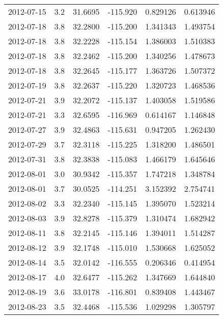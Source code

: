 \begin{tabular}{lrrrrr}
2012-07-15 &       3.2 &  31.6695 &  -115.920 &         0.829126 &         0.613946 \\
2012-07-18 &       3.8 &  32.2800 &  -115.200 &         1.341343 &         1.493754 \\
2012-07-18 &       3.8 &  32.2228 &  -115.154 &         1.386003 &         1.510383 \\
2012-07-18 &       3.8 &  32.2462 &  -115.200 &         1.340256 &         1.478673 \\
2012-07-18 &       3.8 &  32.2645 &  -115.177 &         1.363726 &         1.507372 \\
2012-07-19 &       3.8 &  32.2637 &  -115.220 &         1.320723 &         1.468536 \\
2012-07-21 &       3.9 &  32.2072 &  -115.137 &         1.403058 &         1.519586 \\
2012-07-21 &       3.3 &  32.6595 &  -116.969 &         0.614167 &         1.146848 \\
2012-07-27 &       3.9 &  32.4863 &  -115.631 &         0.947205 &         1.262430 \\
2012-07-29 &       3.7 &  32.3118 &  -115.225 &         1.318200 &         1.486501 \\
2012-07-31 &       3.8 &  32.3838 &  -115.083 &         1.466179 &         1.645646 \\
2012-08-01 &       3.0 &  30.9342 &  -115.357 &         1.747218 &         1.348784 \\
2012-08-01 &       3.7 &  30.0525 &  -114.251 &         3.152392 &         2.754741 \\
2012-08-02 &       3.3 &  32.2340 &  -115.145 &         1.395070 &         1.523214 \\
2012-08-03 &       3.9 &  32.8278 &  -115.379 &         1.310474 &         1.682942 \\
2012-08-11 &       3.8 &  32.2145 &  -115.146 &         1.394011 &         1.514287 \\
2012-08-12 &       3.9 &  32.1748 &  -115.010 &         1.530668 &         1.625052 \\
2012-08-14 &       3.5 &  32.0142 &  -116.555 &         0.206346 &         0.414954 \\
2012-08-17 &       4.0 &  32.6477 &  -115.262 &         1.347669 &         1.644840 \\
2012-08-19 &       3.6 &  33.0178 &  -116.801 &         0.839408 &         1.443467 \\
2012-08-23 &       3.5 &  32.4468 &  -115.536 &         1.029298 &         1.305797 \\

\end{tabular}
